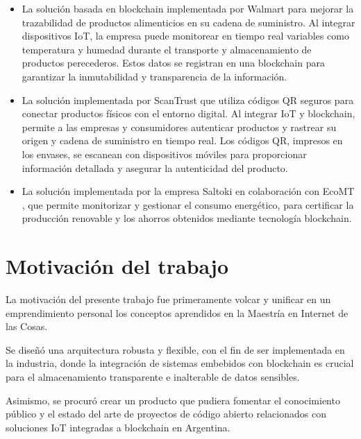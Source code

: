 \begin{itemize}

	\item La solución basada en blockchain implementada por Walmart \citep{iot_usecase_blockchain_walmart} para mejorar la trazabilidad de productos alimenticios en su cadena de suministro. Al integrar dispositivos IoT, la empresa puede monitorear en tiempo real variables como temperatura y humedad durante el transporte y almacenamiento de productos perecederos. Estos datos se registran en una blockchain para garantizar la inmutabilidad y transparencia de la información.
	
	\item La solución implementada por ScanTrust \citep{iot_usecase_blockchain_scantrust} que utiliza códigos QR seguros para conectar productos físicos con el entorno digital. Al integrar IoT y blockchain, permite a las empresas y consumidores autenticar productos y rastrear su origen y cadena de suministro en tiempo real. Los códigos QR, impresos en los envases, se escanean con dispositivos móviles para proporcionar información detallada y asegurar la autenticidad del producto.
		
	\item La solución implementada por la empresa Saltoki en colaboración con EcoMT \citep{iot_usecase_blockchain_saltoki}, que permite monitorizar y gestionar el consumo energético, para certificar la producción renovable y los ahorros obtenidos mediante tecnología blockchain. 
	
	
\end{itemize}




\section{Motivación del trabajo}


La motivación del presente trabajo fue primeramente volcar y unificar en un emprendimiento personal los conceptos aprendidos en la Maestría en Internet de las Cosas. 

Se diseñó una arquitectura robusta y flexible, con el fin de ser implementada en la industria, donde la integración de sistemas embebidos con blockchain es crucial para el almacenamiento transparente e inalterable de datos sensibles.

Asimismo, se procuró crear un producto que pudiera fomentar el conocimiento público y el estado del arte de proyectos de código abierto relacionados con soluciones IoT integradas a blockchain en Argentina.

